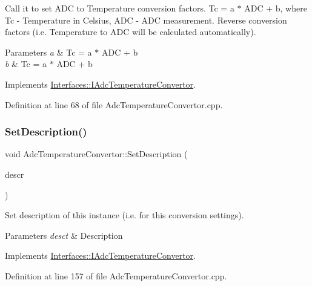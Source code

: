 Call it to set A\+DC to Temperature conversion factors. Tc = a $\ast$ A\+DC + b, where Tc -\/ Temperature in Celsius, A\+DC -\/ A\+DC measurement. Reverse conversion factors (i.\+e. Temperature to A\+DC will be calculated automatically). 


\begin{DoxyParams}{Parameters}
{\em a} & Tc = a $\ast$ A\+DC + b \\
\hline
{\em b} & Tc = a $\ast$ A\+DC + b \\
\hline
\end{DoxyParams}


Implements \hyperlink{class_interfaces_1_1_i_adc_temperature_convertor_a3e4c9204b3593bc434a041c7a69c430f}{Interfaces\+::\+I\+Adc\+Temperature\+Convertor}.



Definition at line 68 of file Adc\+Temperature\+Convertor.\+cpp.

\mbox{\label{class_adc_temperature_convertor_a56103443d7da4769339ddb685a0a8df0}} 
\subsubsection{\texorpdfstring{Set\+Description()}{SetDescription()}}
{\footnotesize\ttfamily void Adc\+Temperature\+Convertor\+::\+Set\+Description (\begin{DoxyParamCaption}\item[{Q\+String}]{descr }\end{DoxyParamCaption})\hspace{0.3cm}{\ttfamily [virtual]}}



Set description of this instance (i.\+e. for this conversion settings). 


\begin{DoxyParams}{Parameters}
{\em desct} & Description \\
\hline
\end{DoxyParams}


Implements \hyperlink{class_interfaces_1_1_i_adc_temperature_convertor_a65bbef2300e21c495d95305921ddb74b}{Interfaces\+::\+I\+Adc\+Temperature\+Convertor}.



Definition at line 157 of file Adc\+Temperature\+Convertor.\+cpp.

